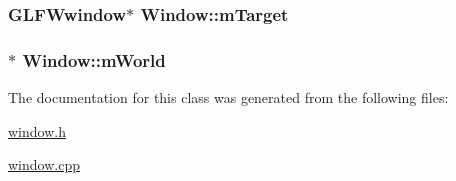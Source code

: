 \subsubsection[{m\+Target}]{\setlength{\rightskip}{0pt plus 5cm}G\+L\+F\+Wwindow$\ast$ Window\+::m\+Target\hspace{0.3cm}{\ttfamily [private]}}\label{classWindow_a7a550555d11ea29c11c676dacd461a9d}
\hypertarget{classWindow_afb9b02f2043b74bd89ac7d1f59c269b4}{}
\subsubsection[{m\+World}]{$\ast$ Window\+::m\+World\hspace{0.3cm}{\ttfamily [private]}}\label{classWindow_afb9b02f2043b74bd89ac7d1f59c269b4}


The documentation for this class was generated from the following files\+:\begin{DoxyCompactItemize}
\item 
\hyperlink{window_8h}{window.\+h}\item 
\hyperlink{window_8cpp}{window.\+cpp}\end{DoxyCompactItemize}

